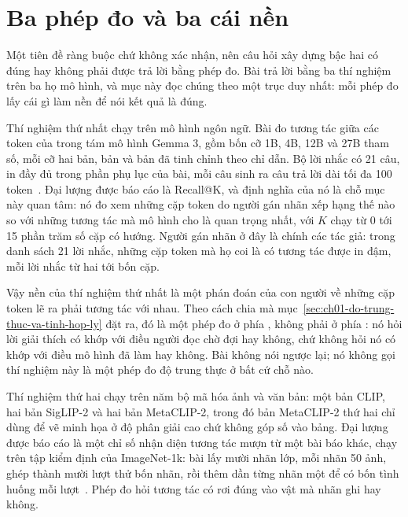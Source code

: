 \section{Ba phép đo và ba cái nền}
\label{sec:ch11-ba-phep-do-va-ba-cai-nen}

%
Một tiên đề ràng buộc chứ không xác nhận, nên câu hỏi xây dựng bậc hai có đúng
hay không phải được trả lời bằng phép đo. Bài trả lời bằng ba thí nghiệm trên
ba họ mô hình, và mục này đọc chúng theo một trục duy nhất: mỗi phép đo lấy cái
gì làm nền để nói kết quả là đúng.

Thí nghiệm thứ nhất chạy trên mô hình ngôn ngữ. Bài đo tương tác giữa các token
của  trong tám mô hình Gemma 3, gồm bốn cỡ 1B, 4B, 12B và 27B tham số,
mỗi cỡ hai bản, bản  và bản đã tinh chỉnh theo chỉ dẫn. Bộ lời
nhắc có 21 câu, in đầy đủ trong phần phụ lục của bài, mỗi câu sinh ra câu trả
lời dài tối đa 100 token~\autocite{p23metagame}. Đại lượng được báo cáo là
Recall@K, và định nghĩa của nó là chỗ mục này quan tâm: nó đo xem những cặp
token do người gán nhãn xếp hạng thế nào so với những tương tác mà mô hình cho
là quan trọng nhất, với $K$ chạy từ 0 tới 15 phần trăm số cặp có hướng. Người
gán nhãn ở đây là chính các tác giả: trong danh sách 21 lời nhắc, những cặp
token mà họ coi là có tương tác được in đậm, mỗi lời nhắc từ hai tới bốn cặp.

Vậy nền của thí nghiệm thứ nhất là một phán đoán của con người về những cặp
token lẽ ra phải tương tác với nhau. Theo cách chia mà
mục~\ref{sec:ch01-do-trung-thuc-va-tinh-hop-ly} đặt ra, đó là một phép đo ở
phía , không phải ở phía : nó hỏi
lời giải thích có khớp với điều người đọc chờ đợi hay không, chứ không hỏi nó
có khớp với điều mô hình đã làm hay không. Bài không nói ngược lại; nó không
gọi thí nghiệm này là một phép đo độ trung thực ở bất cứ chỗ nào.

Thí nghiệm thứ hai chạy trên năm bộ mã hóa ảnh và văn bản: một bản CLIP, hai
bản SigLIP-2 và hai bản MetaCLIP-2, trong đó bản MetaCLIP-2 thứ hai chỉ dùng để
vẽ minh họa ở độ phân giải cao chứ không góp số vào bảng. Đại lượng được báo cáo là một chỉ số nhận diện tương
tác mượn từ một bài báo khác, chạy trên tập kiểm định của ImageNet-1k: bài lấy
mười nhãn lớp, mỗi nhãn 50 ảnh, ghép thành mười lượt thử bốn nhãn, rồi thêm dần
từng nhãn một để có bốn tình huống mỗi lượt~\autocite{p23metagame}. Phép đo
hỏi tương tác có rơi đúng vào vật mà nhãn ghi hay không.


